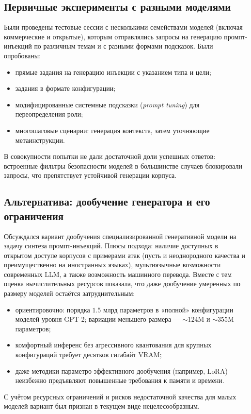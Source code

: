 \subsection{Первичные эксперименты с разными моделями}
Были проведены тестовые сессии с несколькими семействами моделей (включая коммерческие и открытые), которым отправлялись запросы на генерацию промпт-инъекций по различным темам и с разными формами подсказок. Были опробованы:
\begin{itemize}
  \item прямые задания на генерацию инъекции с указанием типа и цели;
  \item задания в формате конфигурации;
  \item модифицированные системные подсказки (\emph{prompt tuning}) для переопределения роли;
  \item многошаговые сценарии: генерация контекста, затем уточняющие метаинструкции.
\end{itemize}
В совокупности попытки не дали достаточной доли успешных ответов: встроенные фильтры безопасности моделей в большинстве случаев блокировали запросы, что препятствует устойчивой генерации корпуса.

\subsection{Альтернатива: дообучение генератора и его ограничения}
Обсуждался вариант дообучения специализированной генеративной модели на задачу синтеза промпт-инъекций. Плюсы подхода: наличие доступных в открытом доступе корпусов с примерами атак (пусть и неоднородного качества и преимущественно на иностранных языках), мультиязычные возможности современных LLM, а также возможность машинного перевода. Вместе с тем оценка вычислительных ресурсов показала, что даже дообучение умеренных по размеру моделей остаётся затруднительным:
\begin{itemize}
  \item ориентировочно: порядка $1.5$ млрд параметров в «полной» конфигурации моделей уровня GPT-2; вариации меньшего размера --- $\sim124$M и $\sim355$M параметров;
  \item комфортный инференс без агрессивного квантования для крупных конфигураций требует десятков гигабайт VRAM;
  \item даже методики параметро-эффективного дообучения (например, LoRA) неизбежно предъявляют повышенные требования к памяти и времени.
\end{itemize}
С учётом ресурсных ограничений и рисков недостаточной качества для малых моделей вариант был признан в текущем виде нецелесообразным.

